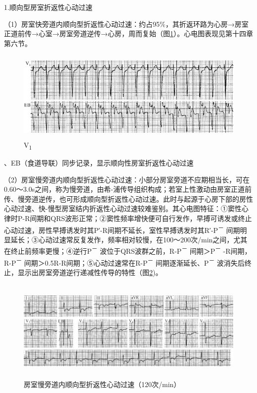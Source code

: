 1.顺向型房室折返性心动过速

（1）房室快旁道内顺向型折返性心动过速：约占95\%，其折返环路为心房→房室正道前传→心室→房室旁道逆传→心房，周而复始（图\ref{fig29-4}）。心电图表现见第十四章第六节。

\begin{figure}[!htbp]
 \centering
 \includegraphics[width=5.04167in,height=1.73958in]{./images/Image00488.jpg}
 \captionsetup{justification=centering}
 \caption{V\textsubscript{1}}
 \label{fig29-4}
  \end{figure} 
、EB（食道导联）同步记录，显示顺向性房室折返性心动过速

（2）房室慢旁道内顺向型折返性心动过速：小部分房室旁道不应期相当长，可在0.60～3.0s之间，称为慢旁道，由希-浦传导组织构成；若室上性激动由房室正道前传、慢旁道逆传，也可形成顺向型折返性心动过速。此时与起源于心房下部的房性心动过速、快-慢型房室结内折返性心动过速较难鉴别。其心电图特征：①窦性心律时P-R间期和QRS波形正常；②窦性频率增快便可自行发作，早搏可诱发或终止心动过速，房性早搏诱发时其P′-R间期不延长，室性早搏诱发时其R′-P\textsuperscript{－}
间期明显延长；③心动过速常反复发作，频率相对较慢，在100～200次/min之间，尤其在终止前频率更慢；④逆行P\textsuperscript{－}
波位于QRS波群之前，R-P\textsuperscript{－} 间期＞P\textsuperscript{－}
-R间期，R-P\textsuperscript{－}
间期＞0.5R-R间期；⑤心动过速常在R-P\textsuperscript{－}
间期逐渐延长、P\textsuperscript{－}
波消失后终止，显示出房室旁道逆行递减性传导的特性（图\ref{fig29-5})。

\begin{figure}[!htbp]
 \centering
 \includegraphics[width=5.78125in,height=1.95833in]{./images/Image00489.jpg}
 \captionsetup{justification=centering}
 \caption{房室慢旁道内顺向型折返性心动过速（120次/min）}
 \label{fig29-5}
  \end{figure} 

